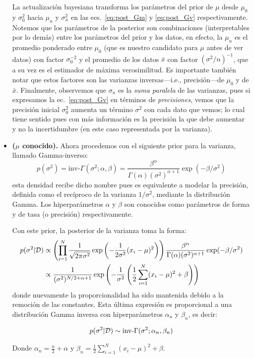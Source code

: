 \begin{itemize}
\begin{remark}
	La actualización bayesiana transforma los parámetros del prior de  $\mu$ desde  $\mu_0$ y $\sigma_0^2$ hacia $\mu_n$ y $\sigma_n^2$ en las ecs.~\eqref{eq:post_Gm} y \eqref{eq:post_Gv} respectivamente. Notemos que los  parámetros de la posterior son combinaciones (interpretables por lo demás) entre los parámetros del prior y los datos, en efecto, la $\mu_n$ es el promedio ponderado entre  $\mu_0$ (que es nuestro candidato para $\mu$ antes de ver datos) con factor $\sigma_0^{-2}$ y el promedio de los datos $\bar{x}$ con factor $(\sigma^{2}/n)^{-1}$, que a su vez es el estimador de máxima verosimilitud. Es importante también notar que  estos  factores son las varianzas inversas---i.e., precisión---de $\mu_0$ y de $\bar{x}$. Finalmente, observemos que $\sigma_n$ es la \emph{suma paralela} de las varianzas, pues  si expresamos la ec.~\eqref{eq:post_Gv} en términos de \emph{precisiones}, vemos que la precisión inicial $\sigma_0^2$ aumenta un término $\sigma^2$ con cada dato que vemos; lo cual tiene sentido pues con más información es la precisión la que debe aumentar y no la incertidumbre (en este caso representada por la varianza).
\end{remark}


\item \textbf{($\mu$ conocido).} Ahora procedemos con el siguiente prior para la varianza, llamado Gamma-inverso:
 \begin{equation}
 	p(\sigma^2)= \text{inv-}\Gamma(\sigma^2;\alpha,\beta) = \frac{\beta^\alpha}{\Gamma(\alpha) (\sigma^2)^{\alpha+1}}\exp(-\beta/\sigma^2)
 \end{equation}
 esta densidad recibe dicho nombre pues es equivalente a modelar la precisión, definida como el recíproco de la varianza $1/\sigma^2$, mediante la distribución Gamma. Los hiperparámetros $\alpha$ y $\beta$ son conocidos como parámetros de forma y de tasa (o precisión) respectivamente. 

 Con este prior, la posterior de la varianza toma la forma:
 \begin{align}
 	p(\sigma^2|{\mathcal D}) &\propto \left(\prod_{i=1}^N \frac{1}{\sqrt{2\pi\sigma^2}}\exp\left(-\frac{1}{2\sigma^2}(x_i-\mu)^2\right)\right) \frac{\beta^\alpha}{\Gamma(\alpha) (\sigma^2)^{\alpha+1}}\exp(-\beta/\sigma^2)\\
 	&\propto  \frac{1}{(\sigma^2)^{N/2+\alpha+1}}\exp\left(-\frac{1}{\sigma^2}\left(\frac{1}{2}\sum_{i=1}^N(x_i-\mu)^2 +\beta\right) \right)\nonumber
 \end{align} 
 donde nuevamente la proporcionalidad ha sido mantenida debido a la remoción de las constantes. Esta última expresión es proporcional a una distribución Gamma inversa con hiperparámetros $\alpha_n$ y $\beta_n$, es decir:
 
 \begin{equation}
 	p(\sigma^2|{\mathcal D}) \sim \text{inv-}\Gamma(\sigma^2;\alpha_n,\beta_n)
 \end{equation}
 
 Donde $\alpha_n = \frac{n}{2}+\alpha$ y $\beta_n = \frac{1}{2}\sum_{i=1}^N(x_i-\mu)^2 +\beta$.

\end{itemize}

